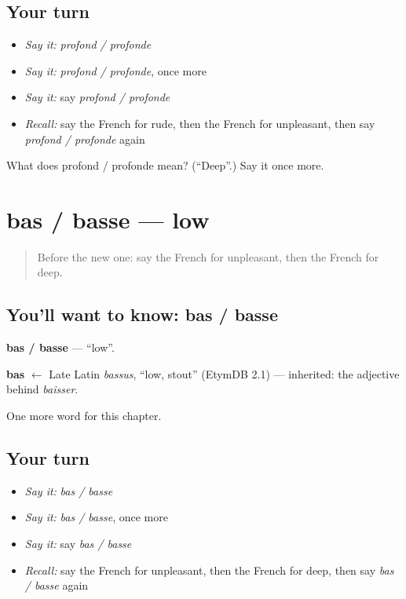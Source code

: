 \subsection*{Your turn}
\begin{itemize}
\raggedright
  \item \emph{Say it:} \emph{profond / profonde}
  \item \emph{Say it:} \emph{profond / profonde}, once more
  \item \emph{Say it:} say \emph{profond / profonde}
  \item \emph{Recall:} say the French for rude, then the French for unpleasant, then say \emph{profond / profonde} again
\end{itemize}

\begin{tcolorbox}[breakable,colback=teal!4,colframe=teal!35!black,title={Before you move on}]
What does profond / profonde mean? (\textquotedblleft{}Deep\textquotedblright{}.) Say it once more.
\end{tcolorbox}
\section[bas / basse]{bas / basse — low}

\label{lesson:FR-C160-bas-basse}



\begin{quote}
Before the new one: say the French for unpleasant, then the French for deep.
\end{quote}

\subsection*{You'll want to know: bas / basse}
\textbf{bas / basse} — \textquotedblleft{}low\textquotedblright{}.

\begin{cousinweb}
\textbf{bas} $\leftarrow$ Late Latin \emph{bassus}, \textquotedblleft{}low, stout\textquotedblright{} (EtymDB 2.1) — inherited: the adjective behind \emph{baisser}.
\end{cousinweb}

\begin{grammarlens}[title={What you've built}]
One more word for this chapter.
\end{grammarlens}

\subsection*{Your turn}
\begin{itemize}
\raggedright
  \item \emph{Say it:} \emph{bas / basse}
  \item \emph{Say it:} \emph{bas / basse}, once more
  \item \emph{Say it:} say \emph{bas / basse}
  \item \emph{Recall:} say the French for unpleasant, then the French for deep, then say \emph{bas / basse} again
\end{itemize}

